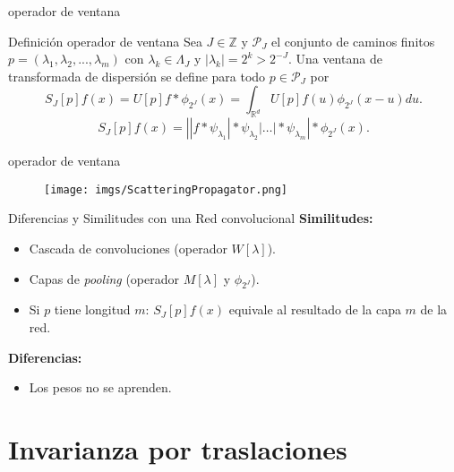 \documentclass[aspectratio=43]{beamer}
\begin{document}
\begin{frame}{operador de ventana}
  \begin{block}{Definición operador de ventana}
    Sea $J \in \mathbb{Z}$ y $\mathcal{P}_J$ el conjunto de caminos finitos $p=(\lambda_1,\lambda_2,...,\lambda_m)$ con $\lambda_k \in \Lambda_J$ y $|\lambda_k|=2^{k}>2^{-J}$. Una ventana de transformada de dispersión se define para todo $p \in \mathcal{P}_J$ por
    \begin{equation}
      S_J[p]f(x)=U[p]f \ast \phi_{2^J}(x)=\int_{\mathbb{R}^d}U[p]f(u)\phi_{2^J}(x-u)du.
    \end{equation}
    \begin{equation}
      S_J[p]f(x)=\left| |f \ast \psi_{\lambda_1} | \ast \psi_{\lambda_2} | \ldots | \ast \psi_{\lambda_m} \right| \ast \phi_{2^J}(x).
    \end{equation}
  \end{block}
\end{frame}


\begin{frame}{operador de ventana}
  \begin{figure}
    \centering
    \texttt{[image: imgs/ScatteringPropagator.png]}
  \end{figure}
\end{frame}

\begin{frame}{Diferencias y Similitudes con una Red convolucional}
  \textbf{\textcolor{tudCyan}{Similitudes:}}
  \begin{itemize}
    \item Cascada de convoluciones (operador $W[\lambda]$).
    \item Capas de \textit{pooling} (operador $M[\lambda]$ y $\phi_{2^J}$).
    \item Si $p$ tiene longitud $m$: $S_J[p]f(x)$ equivale al resultado de la capa $m$ de la red.
  \end{itemize}

  \textbf{\textcolor{tudCyan}{Diferencias:}}
  \begin{itemize}
    \item Los pesos no se aprenden.
  \end{itemize}
\end{frame}

\section{Invarianza por traslaciones}
\end{document}
